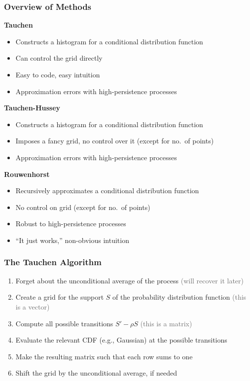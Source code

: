 \documentclass[10pt, aspectratio=1610, handout]{beamer}
\newcommand{\dimmer}[1]{\textcolor{dimgray}{#1}}
\begin{document}
  \begin{frame}
    \frametitle{Overview of Methods}

    \textbf{Tauchen}
    \begin{itemize}
      \item Constructs a histogram for a conditional distribution function
      \item Can control the grid directly
      \item Easy to code, easy intuition
      \item Approximation errors with high-persistence processes
    \end{itemize}

    \vfill\pause

    \textbf{Tauchen-Hussey}
    \begin{itemize}
      \item Constructs a histogram for a conditional distribution function
      \item Imposes a fancy grid, no control over it (except for no.~of points)
      \item Approximation errors with high-persistence processes
    \end{itemize}

    \vfill\pause

    \textbf{Rouwenhorst}
    \begin{itemize}
      \item Recursively approximates a conditional distribution function
      \item No control on grid (except for no.~of points)
      \item Robust to high-persistence processes
      \item ``It just works,'' non-obvious intuition
    \end{itemize}

  \end{frame}

  \begin{frame}
    \frametitle{The Tauchen Algorithm}

    \begin{enumerate}
      \item Forget about the unconditional average of the process \hfill \dimmer{(will recover it later)}
      \vfill\pause
      \item Create a grid for the support $S$ of the probability distribution function \hfill \dimmer{(this is a vector)}
      \vfill\pause
      \item Compute all possible transitions $S' - \rho S$ \hfill \dimmer{(this is a matrix)}
      \vfill\pause
      \item Evaluate the relevant CDF (e.g., Gaussian) at the possible transitions
      \vfill\pause
      \item Make the resulting matrix such that each row sums to one
      \vfill\pause
      \item Shift the grid by the unconditional average, if needed
    \end{enumerate}

  \end{frame}
\end{document}
